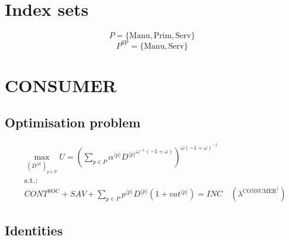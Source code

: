 

\section*{Index sets}

$$P = \{ \mathrm{Manu}, \mathrm{Prim}, \mathrm{Serv} \}$$
$$P^{\mathrm{SP}} = \{ \mathrm{Manu}, \mathrm{Serv} \}$$

\section{CONSUMER}

\subsection{Optimisation problem}

\begin{align}
&\max_{\left({D}^{\langle p\rangle}\right)_{p\in P}
} U = \left(\sum_{p\in P} {{\alpha}^{\langle p\rangle}} {{{D}^{\langle p\rangle}}^{{\omega}^{-1} \left(-1 + \omega\right)}}\right)^{{\omega} \left(-1 + \omega\right)^{-1}}\\
&\mathrm{s.t.:}\nonumber\\
& {C\!O\!N\!T}^{\mathrm{SOC}} + {S\!A\!V} + \sum_{p\in P} {{p}^{\langle p\rangle}} {{D}^{\langle p\rangle}} \left(1 + {{v\!a\!t}}^{\langle p\rangle}\right) = {I\!N\!C} \quad \left(\lambda^{\mathrm{CONSUMER}^{\mathrm{1}}}\right)
\end{align}


\subsection{Identities}

